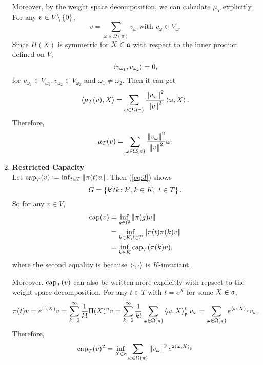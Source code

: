 \documentclass[suri,pdfbookmark]{engsuribt} %
\begin{document}
\begin{enumerate}[label = \arabic*.]
    Moreover, by the weight space decomposition, we can calculate $\mu_T$ explicitly. For any $v \in V \backslash \left\{0\right\}$,
    \begin{equation*}
      v = \sum_{\omega \in \Omega(\pi)}v_{\omega} \text{ with } v_{\omega} \in V_{\omega}.
    \end{equation*}
    Since $\Pi(X)$ is symmetric for $X \in \mathfrak{a}$ with respect to the inner product defined on $V$, 
    \begin{equation*}
      \left\langle v_{\omega_1},v_{\omega_2} \right\rangle = 0, 
    \end{equation*}
    for $v_{\omega_1} \in V_{\omega_1}, v_{\omega_2} \in V_{\omega_2}$ and $\omega_1 \neq \omega_2$. Then it can get
    \begin{equation*}
      \left\langle \mu_T(v),X \right\rangle = \sum_{\omega \in \Omega(\pi)}\frac{\left\lVert v_{\omega}\right\lVert^2}{\left\lVert v\right\lVert^2}\left\langle \omega, X \right\rangle.
    \end{equation*}
    Therefore,
    \begin{equation}\label{eq:1}
      \mu_T(v) = \sum_{\omega \in \Omega(\pi)}\frac{\left\lVert v_{\omega}\right\lVert^2}{\left\lVert v\right\lVert^2}\omega.
    \end{equation}

    \item \textbf{Restricted Capacity} \\
    Let $\operatorname{cap}_T(v) \vcentcolon= \inf_{t \in T} \left\lVert\pi(t)v\right\lVert$. Then (\ref{eq:3}) shows
    \begin{equation*}
      G = \left\{k^{\prime}tk \colon k^{\prime},k \in K,~t \in T\right\}.
    \end{equation*}
    So for any $v \in V$,
    \begin{equation}\label{eq:6}
      \begin{split}
        \operatorname{cap}(v) &= \inf_{g \in G} \left\lVert\pi(g)v\right\lVert \\
        &= \inf_{k\in K,t \in T} \left\lVert\pi(t)\pi(k)v\right\lVert \\
        &= \inf_{k \in K} \operatorname{cap}_T(\pi(k)v),
      \end{split}
    \end{equation}
    where the second equality is because $\left\langle \cdot,\cdot \right\rangle$ is $K$-invariant.

    Moreover, $\operatorname{cap}_T(v)$ can also be written more explicitly with repsect to the weight space decomposition. For any $t \in T$ with $t = e^X$ for some $X \in \mathfrak{a}$,
    \begin{equation*}
      \pi(t)v = e^{\Pi(X)}v = \sum_{k=0}^{\infty}\frac{1}{k!} \Pi(X)^nv = \sum_{k=0}^{\infty}\frac{1}{k!} \sum_{\omega \in \Omega(\pi)} \left\langle \omega,X \right\rangle_{\mathfrak{p}}^nv_{\omega} = \sum_{\omega \in \Omega(\pi)} e^{\left\langle \omega,X \right\rangle_{\mathfrak{p}}}v_{\omega}.
    \end{equation*}
    Therefore, 
    \begin{equation}\label{eq:2}
      \operatorname{cap}_T(v)^2 = \inf_{X \in \mathfrak{a}} \sum_{\omega \in \Omega(\pi)} \left\lVert v_{\omega}\right\lVert^2e^{2\left\langle \omega,X \right\rangle_{\mathfrak{p}}}
    \end{equation}
  \end{enumerate}
\end{document}
